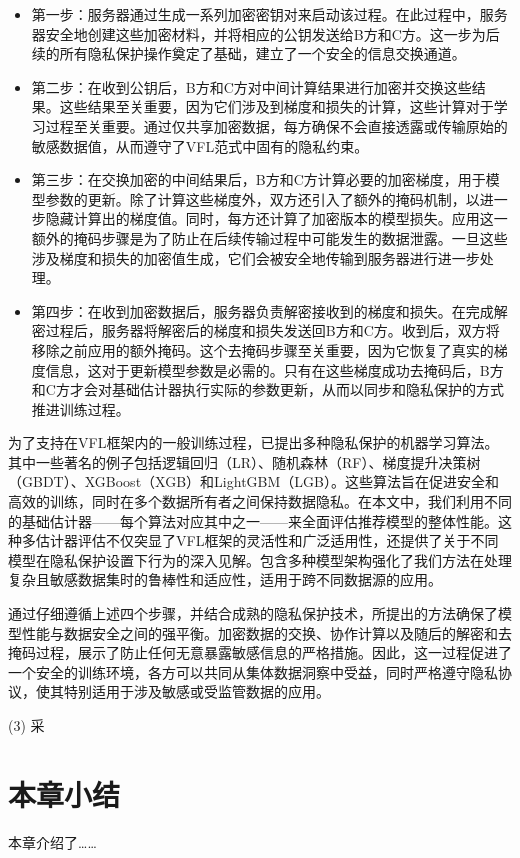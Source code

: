 \begin{itemize}
	\item 第一步：服务器通过生成一系列加密密钥对来启动该过程。在此过程中，服务器安全地创建这些加密材料，并将相应的公钥发送给B方和C方。这一步为后续的所有隐私保护操作奠定了基础，建立了一个安全的信息交换通道。
	
	\item 第二步：在收到公钥后，B方和C方对中间计算结果进行加密并交换这些结果。这些结果至关重要，因为它们涉及到梯度和损失的计算，这些计算对于学习过程至关重要。通过仅共享加密数据，每方确保不会直接透露或传输原始的敏感数据值，从而遵守了VFL范式中固有的隐私约束。
	
	\item 第三步：在交换加密的中间结果后，B方和C方计算必要的加密梯度，用于模型参数的更新。除了计算这些梯度外，双方还引入了额外的掩码机制，以进一步隐藏计算出的梯度值。同时，每方还计算了加密版本的模型损失。应用这一额外的掩码步骤是为了防止在后续传输过程中可能发生的数据泄露。一旦这些涉及梯度和损失的加密值生成，它们会被安全地传输到服务器进行进一步处理。
	
	\item 第四步：在收到加密数据后，服务器负责解密接收到的梯度和损失。在完成解密过程后，服务器将解密后的梯度和损失发送回B方和C方。收到后，双方将移除之前应用的额外掩码。这个去掩码步骤至关重要，因为它恢复了真实的梯度信息，这对于更新模型参数是必需的。只有在这些梯度成功去掩码后，B方和C方才会对基础估计器执行实际的参数更新，从而以同步和隐私保护的方式推进训练过程。
\end{itemize}

为了支持在VFL框架内的一般训练过程，已提出多种隐私保护的机器学习算法\textsuperscript{\cite{yang2019federated}}。其中一些著名的例子包括逻辑回归（LR）\textsuperscript{\cite{he2021secure,yang2019parallel}}、随机森林（RF）\textsuperscript{\cite{yao2022efficient}}、梯度提升决策树（GBDT）\textsuperscript{\cite{he2021secure}}、XGBoost（XGB）\textsuperscript{\cite{xu2021efficient,wang2022feverless}}和LightGBM（LGB）\textsuperscript{\cite{feng2019securegbm}}。这些算法旨在促进安全和高效的训练，同时在多个数据所有者之间保持数据隐私。在本文中，我们利用不同的基础估计器——每个算法对应其中之一——来全面评估推荐模型的整体性能。这种多估计器评估不仅突显了VFL框架的灵活性和广泛适用性，还提供了关于不同模型在隐私保护设置下行为的深入见解。包含多种模型架构强化了我们方法在处理复杂且敏感数据集时的鲁棒性和适应性，适用于跨不同数据源的应用。

通过仔细遵循上述四个步骤，并结合成熟的隐私保护技术，所提出的方法确保了模型性能与数据安全之间的强平衡。加密数据的交换、协作计算以及随后的解密和去掩码过程，展示了防止任何无意暴露敏感信息的严格措施。因此，这一过程促进了一个安全的训练环境，各方可以共同从集体数据洞察中受益，同时严格遵守隐私协议，使其特别适用于涉及敏感或受监管数据的应用。 

(3) 采 

\section{本章小结}
本章介绍了……